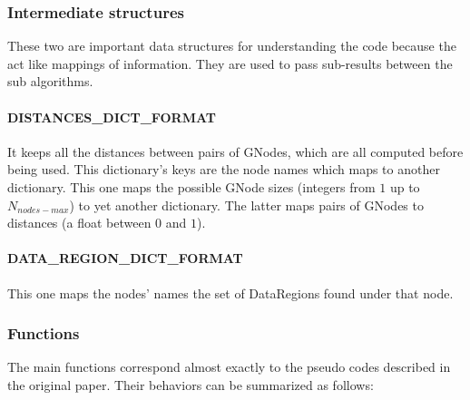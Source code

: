\documentclass[10pt]{article}
\newcommand{\maxnodes}{N_{nodes-max}}
\begin{document}
\subsubsection{Intermediate structures}

These two are important data structures for understanding the code because the act like mappings of information. They are used to pass sub-results between the sub algorithms.

\paragraph{DISTANCES\_DICT\_FORMAT} It keeps all the distances between pairs of GNodes, which are all computed before being used. This dictionary's keys are the node names which maps to another dictionary. This one maps the possible GNode sizes (integers from $1$ up to $\maxnodes$) to yet another dictionary. The latter maps pairs of GNodes to distances (a float between $0$ and $1$).

\paragraph{DATA\_REGION\_DICT\_FORMAT} This one maps the nodes' names the set of DataRegions found under that node.



\subsubsection{Functions} \label{txt:functions} 

The main functions correspond almost exactly to the pseudo codes described in the original paper. Their behaviors can be summarized as follows:
\end{document}
